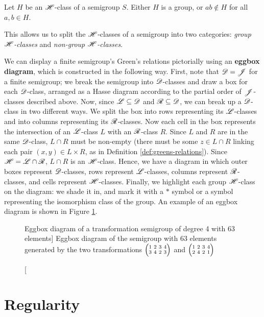 \begin{proposition}
  \label{prop:group-h-class}
  Let $H$ be an $\mathrel{\mathscr{H}}$-class of a semigroup $S$.  Either $H$ is a group, or
  $ab \notin H$ for all $a,b \in H$.
\end{proposition}

This allows us to split the $\mathrel{\mathscr{H}}$-classes of a semigroup into two categories:
\textit{group $\mathrel{\mathscr{H}}$-classes} and \textit{non-group $\mathrel{\mathscr{H}}$-classes}.

We can display a finite semigroup's Green's relations pictorially using an
\textbf{eggbox diagram}, which is constructed in the following way.  First, note
that $\mathscr{D} = \mathscr{J}$ for a finite semigroup; we break the semigroup into
$\mathscr{D}$-classes and draw a box for each $\mathscr{D}$-class, arranged as a Hasse diagram
according to the partial order of $\mathscr{J}$-classes described above.  Now, since
$\mathscr{L} \subseteq \mathscr{D}$ and $\mathscr{R} \subseteq \mathscr{D}$, we can break up a $\mathscr{D}$-class in
two different ways.  We split the box into rows representing its $\mathscr{L}$-classes
and into columns representing its $\mathscr{R}$-classes.  Now each cell in the box
represents the intersection of an $\mathscr{L}$-class $L$ with an $\mathscr{R}$-class $R$.
Since $L$ and $R$ are in the same $\mathscr{D}$-class, $L \cap R$ must be non-empty
(there must be some $z \in L \cap R$ linking each pair $(x,y) \in L \times R$,
as in Definition \ref{def:greens-relations}).  Since $\mathscr{H} = \mathscr{L} \cap \mathscr{R}$,
$L \cap R$ is an $\mathscr{H}$-class.  Hence, we have a diagram in which outer boxes
represent $\mathscr{D}$-classes, rows represent $\mathscr{L}$-classes, columns represent
$\mathscr{R}$-classes, and cells represent $\mathscr{H}$-classes.  Finally, we highlight each
group $\mathscr{H}$-class on the diagram: we shade it in, and mark it with a $*$ symbol
or a symbol representing the isomorphism class of the group.  An example of an
eggbox diagram is shown in Figure \ref{fig:eggbox-diagram}.

\begin{figure}[p]
  \centering
  
  \caption
  [Eggbox diagram of a transformation semigroup of degree 4 with 63 elements]
  {Eggbox diagram of the semigroup with 63 elements generated by the two
    transformations $\transIV3423$ and $\transIV2421$}
  \label{fig:eggbox-diagram}
\end{figure}

\section{Regularity}
\label{sec:intro-regularity}

